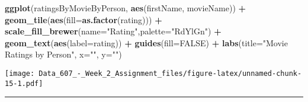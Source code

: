 \documentclass[]{article}
\newenvironment{Shaded}{\begin{snugshade}}{\end{snugshade}}
\newcommand{\KeywordTok}[1]{\textcolor[rgb]{0.13,0.29,0.53}{\textbf{#1}}}
\newcommand{\DataTypeTok}[1]{\textcolor[rgb]{0.13,0.29,0.53}{#1}}
\newcommand{\StringTok}[1]{\textcolor[rgb]{0.31,0.60,0.02}{#1}}
\newcommand{\OtherTok}[1]{\textcolor[rgb]{0.56,0.35,0.01}{#1}}
\newcommand{\OperatorTok}[1]{\textcolor[rgb]{0.81,0.36,0.00}{\textbf{#1}}}
\newcommand{\NormalTok}[1]{#1}
\begin{document}
{\begin{Shaded}
\begin{Highlighting}[]
\KeywordTok{ggplot}\NormalTok{(ratingsByMovieByPerson, }\KeywordTok{aes}\NormalTok{(firstName, movieName)) }\OperatorTok{+}\StringTok{ }\KeywordTok{geom_tile}\NormalTok{(}\KeywordTok{aes}\NormalTok{(}\DataTypeTok{fill=}\KeywordTok{as.factor}\NormalTok{(rating))) }\OperatorTok{+}\StringTok{ }\KeywordTok{scale_fill_brewer}\NormalTok{(}\DataTypeTok{name=}\StringTok{"Rating"}\NormalTok{,}\DataTypeTok{palette=}\StringTok{"RdYlGn"}\NormalTok{) }\OperatorTok{+}\StringTok{ }\KeywordTok{geom_text}\NormalTok{(}\KeywordTok{aes}\NormalTok{(}\DataTypeTok{label=}\NormalTok{rating)) }\OperatorTok{+}\StringTok{ }\KeywordTok{guides}\NormalTok{(}\DataTypeTok{fill=}\OtherTok{FALSE}\NormalTok{) }\OperatorTok{+}\StringTok{ }\KeywordTok{labs}\NormalTok{(}\DataTypeTok{title=}\StringTok{"Movie Ratings by Person"}\NormalTok{, }\DataTypeTok{x=}\StringTok{""}\NormalTok{, }\DataTypeTok{y=}\StringTok{""}\NormalTok{)}
\end{Highlighting}
\end{Shaded}

\texttt{[image: Data\_607\_-\_Week\_2\_Assignment\_files/figure-latex/unnamed-chunk-15-1.pdf]}

\begin{center}\rule{0.5\linewidth}{\linethickness}\end{center}
\end{document}

